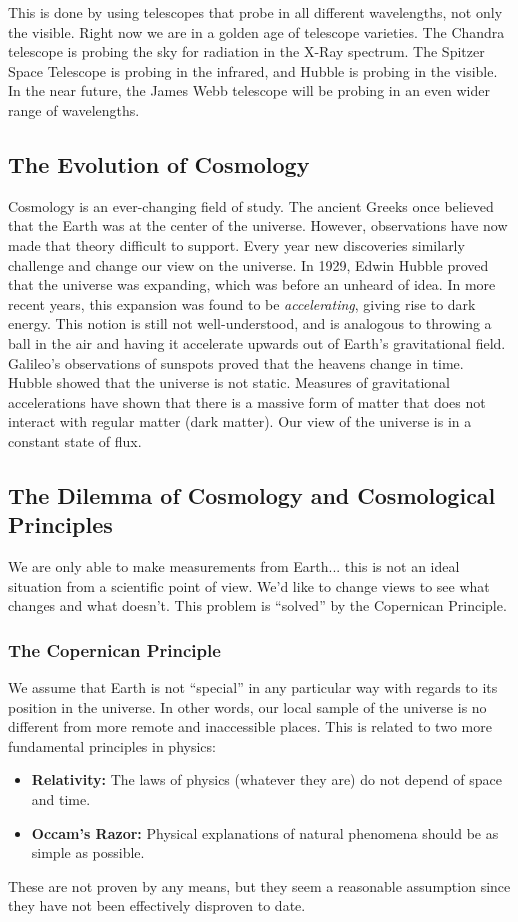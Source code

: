 \documentclass{article}
\begin{document}
	\noindent This is done by using telescopes that probe in all different wavelengths, not only the visible. Right now we are in a golden age of telescope varieties. The Chandra telescope is probing the sky for radiation in the X-Ray spectrum. The Spitzer Space Telescope is probing in the infrared, and Hubble is probing in the visible. In the near future, the James Webb telescope will be probing in an even wider range of wavelengths.
	
	\subsection{The Evolution of Cosmology}
	Cosmology is an ever-changing field of study. The ancient Greeks once believed that the Earth was at the center of the universe. However, observations have now made that theory difficult to support. Every year new discoveries similarly challenge and change our view on the universe. In 1929, Edwin Hubble proved that the universe was expanding, which was before an unheard of idea. In more recent years, this expansion was found to be \emph{accelerating}, giving rise to dark energy. This notion is still not well-understood, and is analogous to throwing a ball in the air and having it accelerate upwards out of Earth's gravitational field.\\
	
	\noindent Galileo's observations of sunspots proved that the heavens change in time. Hubble showed that the universe is not static. Measures of gravitational accelerations have shown that there is a massive form of matter that does not interact with regular matter (dark matter). Our view of the universe is in a constant state of flux.
	
	\subsection{The Dilemma of Cosmology and Cosmological Principles} 
	We are only able to make measurements from Earth... this is not an ideal situation from a scientific point of view. We'd like to change views to see what changes and what doesn't. This problem is ``solved'' by the Copernican Principle.
	
	\subsubsection{The Copernican Principle} We assume that Earth is not ``special'' in any particular way with regards to its position in the universe. In other words, our local sample of the universe is no different from more remote and inaccessible places. This is related to two more fundamental principles in physics:
	\begin{itemize}
		\item \textbf{Relativity:} The laws of physics (whatever they are) do not depend of space and time.
		\item \textbf{Occam's Razor:} Physical explanations of natural phenomena should be as simple as possible.
	\end{itemize}
	These are not proven by any means, but they seem a reasonable assumption since they have not been effectively disproven to date.
\end{document}
